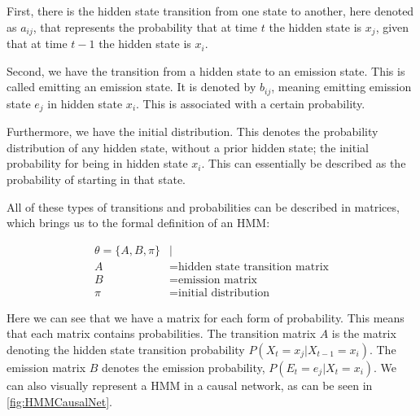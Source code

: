 First, there is the hidden state transition from one state to another, here denoted as $a_{ij}$, that represents the probability that at time $t$ the hidden state is $x_j$, given that at time $t-1$ the hidden state is $x_i$.

Second, we have the transition from a hidden state to an emission state. This is called emitting an emission state. It is denoted by $b_{ij}$, meaning emitting emission state $e_j$ in hidden state $x_i$. This is associated with a certain probability.

Furthermore, we have the initial distribution. This denotes the probability distribution of any hidden state, without a prior hidden state; the initial probability for being in hidden state $x_i$. This can essentially be described as the probability of starting in that state.

All of these types of transitions and probabilities can be described in matrices, which brings us to the formal definition of an HMM:

\begin{align*}
\theta = \{A,B,\pi\} &|\\
A &= \text{hidden state transition matrix}\\
B &= \text{emission matrix}\\
\pi &= \text{initial distribution}
\end{align*}

Here we can see that we have a matrix for each form of probability. This means that each matrix contains probabilities. The transition matrix $A$ is the matrix denoting the hidden state transition probability $P(X_t=x_j|X_{t-1}=x_i)$. The emission matrix $B$ denotes the emission probability, $P(E_t=e_j|X_t=x_i)$. We can also visually represent a HMM in a causal network, as can be seen in \cref{fig:HMMCausalNet}.

